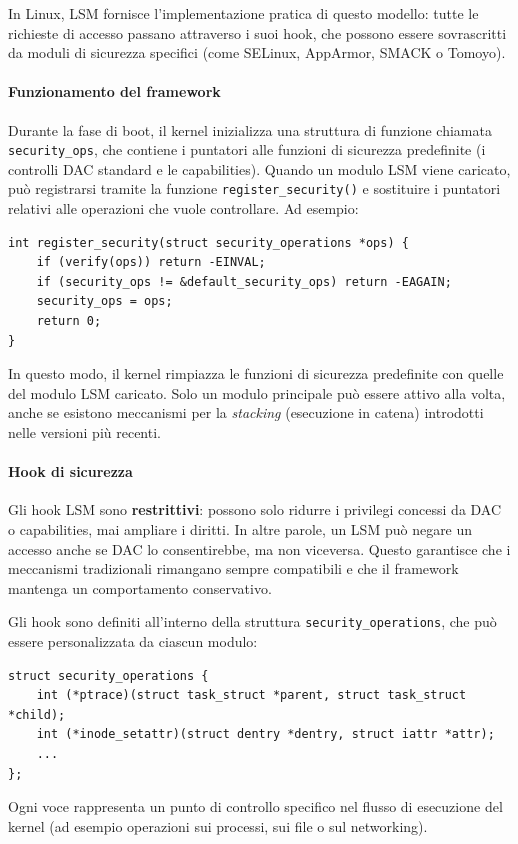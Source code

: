 In Linux, LSM fornisce l’implementazione pratica di questo modello: tutte le richieste di accesso passano attraverso i suoi hook, che possono essere sovrascritti da moduli di sicurezza specifici (come SELinux, AppArmor, SMACK o Tomoyo).

\paragraph{Funzionamento del framework}
Durante la fase di boot, il kernel inizializza una struttura di funzione chiamata \texttt{security\_ops}, che contiene i puntatori alle funzioni di sicurezza predefinite (i controlli DAC standard e le capabilities).
Quando un modulo LSM viene caricato, può registrarsi tramite la funzione \texttt{register\_security()} e sostituire i puntatori relativi alle operazioni che vuole controllare.
Ad esempio:
\begin{verbatim}
int register_security(struct security_operations *ops) {
    if (verify(ops)) return -EINVAL;
    if (security_ops != &default_security_ops) return -EAGAIN;
    security_ops = ops;
    return 0;
}
\end{verbatim}
In questo modo, il kernel rimpiazza le funzioni di sicurezza predefinite con quelle del modulo LSM caricato.
Solo un modulo principale può essere attivo alla volta, anche se esistono meccanismi per la \textit{stacking} (esecuzione in catena) introdotti nelle versioni più recenti.

\paragraph{Hook di sicurezza}
Gli hook LSM sono \textbf{restrittivi}: possono solo ridurre i privilegi concessi da DAC o capabilities, mai ampliare i diritti.
In altre parole, un LSM può negare un accesso anche se DAC lo consentirebbe, ma non viceversa.
Questo garantisce che i meccanismi tradizionali rimangano sempre compatibili e che il framework mantenga un comportamento conservativo.

Gli hook sono definiti all’interno della struttura \texttt{security\_operations}, che può essere personalizzata da ciascun modulo:
\begin{verbatim}
struct security_operations {
    int (*ptrace)(struct task_struct *parent, struct task_struct *child);
    int (*inode_setattr)(struct dentry *dentry, struct iattr *attr);
    ...
};
\end{verbatim}
Ogni voce rappresenta un punto di controllo specifico nel flusso di esecuzione del kernel (ad esempio operazioni sui processi, sui file o sul networking).

